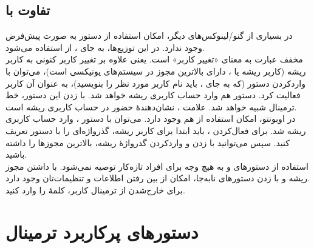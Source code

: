 \subsection[تفاوت sudo با su]{تفاوت  با }
در بسیاری از گنو/لینوکس‌های دیگر، امکان استفاده از دستور  به صورت پیش‌فرض وجود ندارد. در این توزیع‌ها، به جای ، از  استفاده می‌شود.\\
 مخفف عبارت  به معنای «تغییر کاربر» است. یعنی علاوه بر تغییر کاربر کنونی به کاربر ریشه (کاربر ریشه یا ، دارای بالاترین مجوز در سیستم‌های یونیکسی است)، می‌توان با واردکردن دستور  (که به جای ، باید نام کاربر مورد نظر را بنویسید)، به عنوان آن کاربر فعالیت کرد. دستور  هم وارد حساب کاربری ریشه خواهد شد. با زدن این دستور، خط ترمینال شبیه  خواهد شد. علامت \lr{\texttt{\#}}، نشان‌دهندهٔ حضور در حساب کاربری ریشه است.\\
در اوبونتو، امکان استفاده از  هم وجود دارد. می‌توان با دستور ، وارد حساب کاربری ریشه شد. برای فعال‌کردن ، باید ابتدا برای کاربر ریشه، گذرواژه‌ای را با دستور  تعریف کنید. سپس می‌توانید با زدن  و واردکردن گذرواژهٔ ریشه، بالاترین مجوزها را داشته باشید.\\
استفاده از دستورهای  و  به هیچ وجه برای افراد تازه‌کار توصیه نمی‌شود. با داشتن مجوز ریشه و با زدن دستورهای نابه‌جا، امکان از بین رفتن اطلاعات و تنظیمات‌تان وجود دارد.\\
برای خارج‌شدن از ترمینال کاربر، کلمهٔ  را وارد کنید.

\section{دستورهای پرکاربرد ترمینال}
